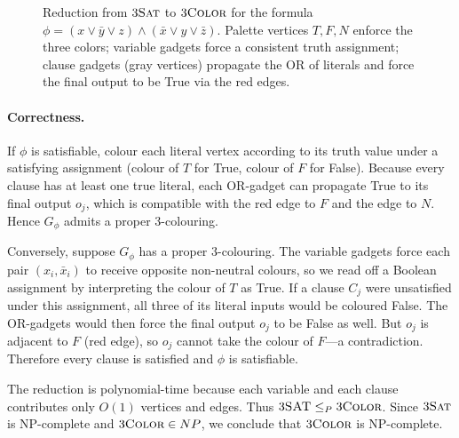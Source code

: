 \documentclass[manuscript,nonacm]{acmart}
\theoremstyle{definition}
\begin{document}
\begin{figure}[htbp]
\caption{Reduction from $3\textsc{Sat}$ to $3\textsc{Color}$ for the formula
$\phi=(x\vee\bar y\vee z)\wedge(\bar x\vee y\vee\bar z)$.  Palette vertices
$T,F,N$ enforce the three colors; variable gadgets force a consistent truth
assignment; clause gadgets (gray vertices) propagate the OR of literals and
force the final output to be True via the red edges.}
\label{fig:3color}
\end{figure}

\paragraph{Correctness.}
If $\phi$ is satisfiable, colour each literal vertex according to its truth
value under a satisfying assignment (colour of $T$ for True, colour of $F$ for
False).  Because every clause has at least one true literal, each OR-gadget
can propagate True to its final output $o_j$, which is compatible with the red
edge to $F$ and the edge to $N$.  Hence $G_\phi$ admits a proper $3$-colouring.

Conversely, suppose $G_\phi$ has a proper $3$-colouring.  The variable gadgets
force each pair $(x_i,\bar x_i)$ to receive opposite non-neutral colours, so we
read off a Boolean assignment by interpreting the colour of $T$ as True.  If a
clause $C_j$ were unsatisfied under this assignment, all three of its literal
inputs would be coloured False.  The OR-gadgets would then force the final
output $o_j$ to be False as well.  But $o_j$ is adjacent to $F$ (red edge), so
$o_j$ cannot take the colour of $F$---a contradiction.  Therefore every clause
is satisfied and $\phi$ is satisfiable.

The reduction is polynomial-time because each variable and each clause
contributes only $O(1)$ vertices and edges. Thus $3\textsc{SAT} \leq_{P} 3\textsc{Color}$. Since $3\textsc{Sat}$ is NP-complete and
$3\textsc{Color}\in NP$, we conclude that $3\textsc{Color}$ is NP-complete.
\end{document}
